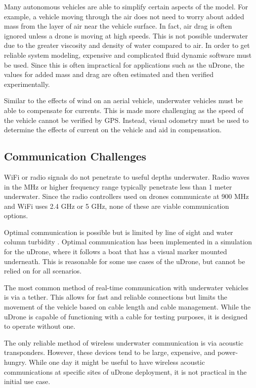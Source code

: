 Many autonomous vehicles are able to simplify certain aspects of the model. For example, a vehicle moving through the air does not need to worry about added mass from the layer of air near the vehicle surface. In fact, air drag is often ignored unless a drone is moving at high speeds. This is not possible underwater due to the greater viscosity and density of water compared to air. In order to get reliable system modeling, expensive and complicated fluid dynamic software must be used. Since this is often impractical for applications such as the uDrone, the values for added mass and drag are often estimated and then verified experimentally. 

Similar to the effects of wind on an aerial vehicle, underwater vehicles must be able to compensate for currents. This is made more challenging as the speed of the vehicle cannot be verified by GPS. Instead, visual odometry must be used to determine the effects of current on the vehicle and aid in compensation. 

\subsection{Communication Challenges}
WiFi or radio signals do not penetrate to useful depths underwater. Radio waves in the MHz or higher frequency range typically penetrate less than 1 meter underwater. Since the radio controllers used on drones communicate at 900 MHz and WiFi uses 2.4 GHz or 5 GHz, none of these are viable communication options. 

Optimal communication is possible but is limited by line of sight and water column turbidity \parencite{light-coms}. Optimal communication has been implemented in a simulation for the uDrone, where it follows a boat that has a visual marker mounted underneath. This is reasonable for some use cases of the uDrone, but cannot be relied on for all scenarios.

The most common method of real-time communication with underwater vehicles is via a tether. This allows for fast and reliable connections but limits the movement of the vehicle based on cable length and cable management. While the uDrone is capable of functioning with a cable for testing purposes, it is designed to operate without one. 

The only reliable method of wireless underwater communication is via acoustic transponders. However, these devices tend to be large, expensive, and power-hungry. While one day it might be useful to have wireless acoustic communications at specific sites of uDrone deployment, it is not practical in the initial use case.

